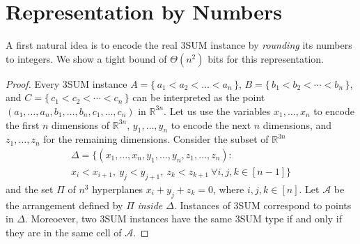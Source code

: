 \section{Representation by Numbers}%
\label{s:numbers}

A first natural idea is to encode the real 3SUM instance by \emph{rounding} its numbers to integers.
We show a tight bound of $\Theta (n^2)$ bits for this representation.
\TheoremSUMEncodingBitsize*

\begin{proof}
Every 3SUM instance \(A = \{\, a_1 < a_2 < \ldots < a_n\,\} \),
\(B = \{\, b_1 < b_2 < \cdots < b_n\,\} \),
and \(C = \{\, c_1 < c_2 < \cdots < c_n\,\}\)
can be interpreted as the point
\( (a_1,\ldots,a_n,b_1,\ldots,b_n,c_1,\ldots,c_n) \)
in \(\mathbb{R}^{3n}\).
Let us use the variables \(x_1,\ldots,x_n\) to encode the first \(n\) dimensions
of \(\mathbb{R}^{3n}\), \(y_1,\ldots,y_n\) to encode the next \(n\) dimensions,
and \(z_1,\ldots,z_n\) for the remaining dimensions.
Consider the subset of $\mathbb{R}^{3n}$
\begin{multline*}
      \Delta = \{ (x_1,\ldots,x_n,y_1,\ldots,y_n,z_1,\ldots,z_n) \colon\, \\
			      x_i<x_{i+1}, ~y_j<y_{j+1}, ~ z_k<z_{k+1}~ \forall i,j,k \in [n-1]\}
\end{multline*}
and the set $\Pi$ of $n^3$ hyperplanes $x_i+y_j+z_k=0$, where $i,j,k\in [n]$.
Let $\mathcal{A}$ be the arrangement defined
by $\Pi$ \emph{inside $\Delta$}. Instances of 3SUM correspond to points in $\Delta$.
Moreoever, two 3SUM instances have the same 3SUM type if and only if they are
in the same cell of $\mathcal{A}$.


\end{proof}
